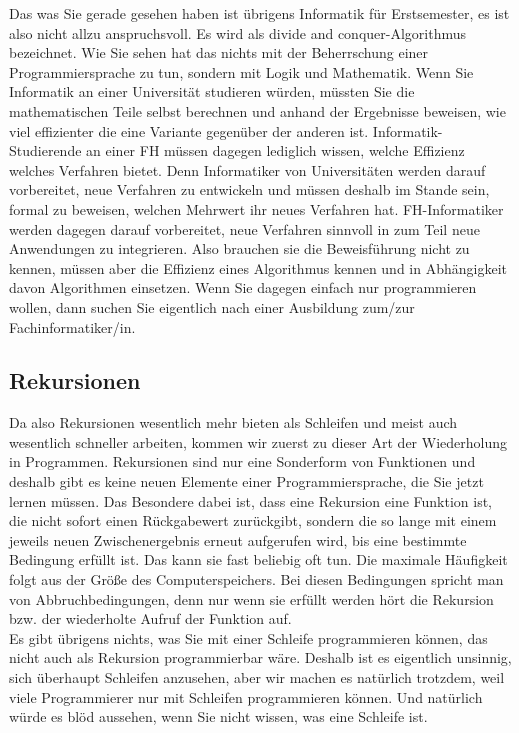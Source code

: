 Das was Sie gerade gesehen haben ist übrigens Informatik für Erstsemester, es ist also nicht allzu anspruchsvoll. Es wird als divide and conquer-Algorithmus bezeichnet. Wie Sie sehen hat das nichts mit der Beherrschung einer Programmiersprache zu tun, sondern mit Logik und Mathematik. Wenn Sie Informatik an einer Universität studieren würden, müssten Sie die mathematischen Teile selbst berechnen und anhand der Ergebnisse beweisen, wie viel effizienter die eine Variante gegenüber der anderen ist. Informatik-Studierende an einer FH müssen dagegen lediglich wissen, welche Effizienz welches Verfahren bietet. Denn Informatiker von Universitäten werden darauf vorbereitet, neue Verfahren zu entwickeln und müssen deshalb im Stande sein, formal zu beweisen, welchen Mehrwert ihr neues Verfahren hat. FH-Informatiker werden dagegen darauf vorbereitet, neue Verfahren sinnvoll in zum Teil neue Anwendungen zu integrieren. Also brauchen sie die Beweisführung nicht zu kennen, müssen aber die Effizienz eines Algorithmus kennen und in Abhängigkeit davon Algorithmen einsetzen. Wenn Sie dagegen einfach \glqq{}nur\grqq{} programmieren wollen, dann suchen Sie eigentlich nach einer Ausbildung zum/zur Fachinformatiker/in.

\subsection{Rekursionen}

Da also Rekursionen wesentlich mehr bieten als Schleifen und meist auch wesentlich schneller arbeiten, kommen wir zuerst zu dieser Art der Wiederholung in Programmen. Rekursionen sind nur eine Sonderform von Funktionen und deshalb gibt es keine neuen Elemente einer Programmiersprache, die Sie jetzt lernen müssen. Das Besondere dabei ist, dass eine Rekursion eine Funktion ist, die nicht sofort einen Rückgabewert zurückgibt, sondern die so lange mit einem jeweils neuen Zwischenergebnis erneut aufgerufen wird, bis eine bestimmte Bedingung erfüllt ist. Das kann sie fast beliebig oft tun. Die maximale Häufigkeit folgt aus der Größe des Computerspeichers. Bei diesen Bedingungen spricht man von Abbruchbedingungen, denn nur wenn sie erfüllt werden hört die Rekursion bzw. der wiederholte Aufruf der Funktion auf.\\

Es gibt übrigens nichts, was Sie mit einer Schleife programmieren können, das nicht auch als Rekursion programmierbar wäre. Deshalb ist es eigentlich unsinnig, sich überhaupt Schleifen anzusehen, aber wir machen es natürlich trotzdem, weil viele Programmierer nur mit Schleifen programmieren können. Und natürlich würde es blöd aussehen, wenn Sie nicht wissen, was eine Schleife ist.\\

